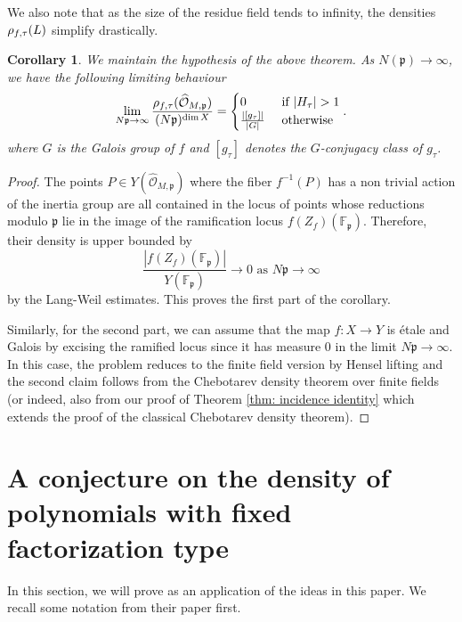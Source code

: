 \documentclass[10pt]{article}
\theoremstyle{plain}
\newtheorem{corollary}[theorem]{Corollary}
\theoremstyle{definition}
\numberwithin{equation}{section}
\begin{document}
We also note that as the size of the residue field tends to infinity, the densities $\rho_{f,\tau}(L)$ simplify drastically.

\begin{corollary}\label{cor: q to infty limiting behaviour}
We maintain the hypothesis of the above theorem. As $N(\mathfrak p) \to \infty$, we have the following limiting behaviour
    \[  \lim_{N\mathfrak p \to \infty}\frac{\rho_{f,\tau}(\widehat{\mathcal O}_{M,\mathfrak p})}{(N\mathfrak p)^{\dim X}} = \begin{cases} 0 & \text{ if } |H_\tau| > 1\\
    \frac{|[g_\tau]|}{|G|} & \text{ otherwise}\end{cases}  .\]
where $G$ is the Galois group of $f$ and $[g_\tau]$ denotes the $G$-conjugacy class of $g_\tau$.
\end{corollary}
\begin{proof}
The points $P \in Y(\widehat{\mathcal O}_{M,\mathfrak p})$ where the fiber $f^{-1}(P)$ has a non trivial action of the inertia group are all contained in the locus of points whose reductions modulo $\mathfrak p$ lie in the image of the ramification locus $f(Z_f)(\mathbb F_{\mathfrak p})$. Therefore, their density is upper bounded by
\[\frac{|f(Z_f)(\mathbb F_{\mathfrak p})|}{Y(\mathbb F_{\mathfrak p})} \to 0 \text{ as } N\mathfrak p \to \infty\]
by the Lang-Weil estimates. This proves the first part of the corollary.

Similarly, for the second part, we can assume that the map $f: X \to Y$ is \'etale and Galois by excising the ramified locus since it has measure $0$ in the limit $N\mathfrak p \to \infty$. In this case, the problem reduces to the finite field version by Hensel lifting and the second claim follows from the Chebotarev density theorem over finite fields (or indeed, also from our proof of Theorem \ref{thm: incidence identity} which extends the proof of the classical Chebotarev density theorem).
\end{proof}
 
\section{A conjecture on the density of polynomials with fixed factorization type}\label{section: factorization types density}

In this section, we will prove \cite[Conjecture 1.2]{bhargava2022density} as an application of the ideas in this paper. We recall some notation from their paper first.
\end{document}
